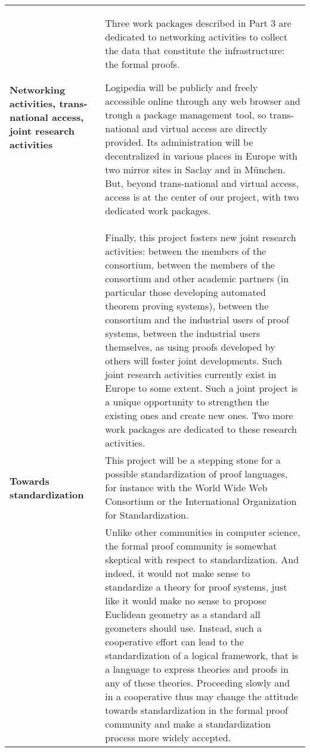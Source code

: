 \begin{longtable}{|p{}|p{}|}
{\bf Networking activities, trans-national access, joint research activities}
&
Three work packages described in Part 3
are dedicated to networking activities
to collect the data that constitute the infrastructure: the formal proofs.

\hspace{0.4cm}
Logipedia will be publicly and freely accessible online through any
web browser and trough a package management tool, so trans-national
and virtual access are directly provided. Its administration will be
decentralized in various places in Europe with two mirror sites in
Saclay and in M\"unchen. But, beyond trans-national and virtual
access, access is at the center of our project, with two dedicated
work packages.\\
&
\hspace{0.4cm}
Finally, this project fosters new joint research activities:
between the members of the consortium, between the members of
the consortium and other academic partners (in particular those
developing automated theorem proving systems), between the
consortium and the industrial users of proof systems, between
the industrial users themselves, as using proofs developed by others
will foster joint developments. Such joint research activities
currently exist in Europe to some extent.  Such a joint project is a
unique opportunity to strengthen the existing ones and create new
ones. Two more work packages are dedicated
to these research activities.  
\\
\hline

{\bf Towards standardization} & This project will be a stepping stone
for a possible standardization of proof languages, for instance with
the World Wide Web Consortium or the International Organization for
Standardization.
\\
&
\hspace{0.4cm}
Unlike other communities in computer science, the formal proof
community is somewhat skeptical with respect to standardization. And
indeed, it would not make sense to standardize a theory for proof
systems, just like it would make no sense to propose Euclidean
geometry as a standard all geometers should use.  Instead, such a
cooperative effort can lead to the standardization of a logical
framework, that is a language to express theories and proofs in any of
these theories. Proceeding slowly and in a cooperative thus may change
the attitude towards standardization in the formal proof community and
make a standardization process more widely accepted.
\\
\hline


\end{longtable}
